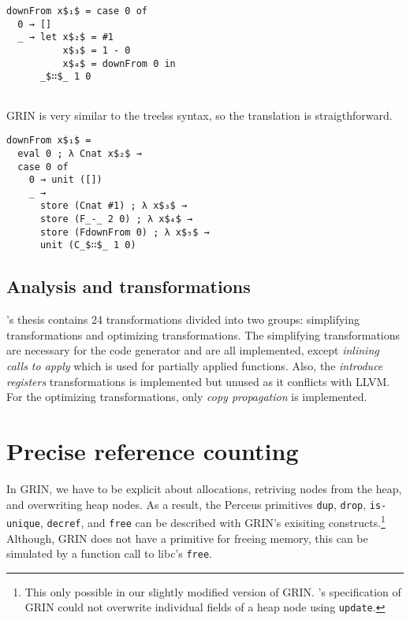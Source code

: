 \documentclass{article}
\begin{document}
\begin{lstlisting}[language=treeless]
downFrom x$₁$ = case 0 of
  0 → []
  _ → let x$₂$ = #1
          x$₃$ = 1 - 0
          x$₄$ = downFrom 0 in 
      _$∷$_ 1 0
          
\end{lstlisting}
% 

GRIN is very similar to the treelss syntax, so the translation is straigthforward.

\begin{lstlisting}[mathescape=true]
downFrom x$₁$ =
  eval 0 ; λ Cnat x$₂$ →
  case 0 of
    0 → unit ([])
    _ →
      store (Cnat #1) ; λ x$₃$ →
      store (F_-_ 2 0) ; λ x$₄$ →
      store (FdownFrom 0) ; λ x$₅$ →
      unit (C_$∷$_ 1 0)
\end{lstlisting}



\subsection{Analysis and transformations}
\citeauthor{boquist1999}'s thesis contains 24 transformations divided into two groups: simplifying transformations and optimizing 
transformations. 
The simplifying transformations are necessary for the code generator and are all implemented, except \emph{inlining calls to apply}
which is used for partially applied functions. 
Also, the \emph{introduce registers} transformations is implemented but unused as it conflicts with LLVM.
For the optimizing transformations, only \emph{copy propagation} is implemented.


\section{Precise reference counting}

In GRIN, we have to be explicit about allocations, retriving nodes from the heap, and overwriting heap nodes.
As a result, the Perceus primitives \texttt{dup}, \texttt{drop}, \texttt{is-unique}, \texttt{decref}, and \texttt{free} 
can be described with GRIN's exisiting constructs.\footnote{This only possible in our slightly modified version of 
GRIN. \citeauthor{boquist1999}'s specification of GRIN could not overwrite individual fields of a heap node 
using \texttt{update}.}
Although, GRIN does not have a primitive for freeing memory, this can be simulated by a function call 
to libc's \texttt{free}.
 
\end{document}
